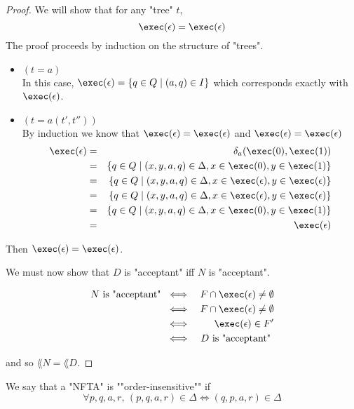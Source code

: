 \documentclass{article}
\begin{document}
\begin{proof}
	We will show that for any "tree" $t$,
	\[ \exec (\epsilon)  = \exec (\epsilon) \]
	The proof proceeds by induction on the structure of "trees".
	\begin{itemize}
		\item $(t = a)$\\
		      In this case, $\exec (\epsilon) = \setdef {q \in Q} {(a,q) \in I}$ which corresponds
		      exactly with $\exec (\epsilon)$.

		\item $(t = a(t',t''))$\\
		      By induction we know that
		      $\exec (\epsilon) = \exec (\epsilon)$
		      and
		      $\exec (\epsilon) =  \exec (\epsilon)$
		      \begin{eqnarray*}
			      \exec (\epsilon) &=& \delta_a(\exec (0), \exec (1)) \\
			      &=& \setdef {q \in  Q} {(x,y,a,q) \in \Delta, x \in \exec (0), y \in \exec (1)}\\
			      &=& \setdef {q \in  Q} {(x,y,a,q) \in \Delta, x \in \exec (\epsilon), y \in \exec (\epsilon)}\\
			      &=& \setdef {q \in  Q} {(x,y,a,q) \in \Delta, x \in \exec (\epsilon), y \in \exec (\epsilon)}\\
			      &=& \setdef {q \in  Q} {(x,y,a,q) \in \Delta, x \in \exec (0), y \in \exec (1)}\\
			      &=& \exec (\epsilon)
		      \end{eqnarray*}
	\end{itemize}
	Then $ \exec (\epsilon) = \exec (\epsilon)$.

	We must now show that $D$ is "acceptant" iff $N$ is "acceptant".

	\begin{eqnarray*}
		N \text{ is "acceptant" } &\iff& F \cap \exec (\epsilon) \neq \emptyset \\
		&\iff& F \cap \exec (\epsilon) \neq \emptyset \\
		&\iff& \exec (\epsilon) \in F' \\
		&\iff& D \text{ is "acceptant" }
	\end{eqnarray*}

	and so $\lang N = \lang D$.

\end{proof}


\begin{definition}
	We say that a "NFTA" is ""order-insensitive"" if
	\[ \forall p,q,a,r,\, (p,q,a,r) \in \Delta \iff  (q,p,a,r) \in \Delta \]
\end{definition}
\end{document}
